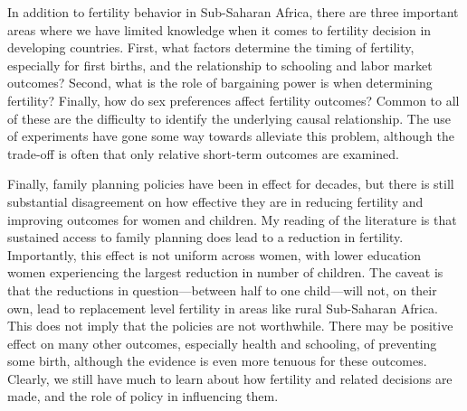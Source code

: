 In addition to fertility behavior in Sub-Saharan Africa, there are three important areas where we have limited knowledge when it comes to fertility decision in developing countries. First, what factors determine the timing of fertility, especially for first births, and the relationship to schooling and labor market outcomes? Second, what is the role of bargaining power is when determining fertility? Finally, how do sex preferences affect fertility outcomes? Common to all of these are the difficulty to identify the underlying causal relationship. The use of experiments have gone some way towards alleviate this problem, although the trade-off is often that only relative short-term outcomes are examined.

Finally, family planning policies have been in effect for decades, but there is still substantial disagreement on how effective they are in reducing fertility and improving outcomes for women and children. My reading of the literature is that sustained access to family planning does lead to a reduction in fertility. Importantly, this effect is not uniform across women, with lower education women experiencing the largest reduction in number of children. The caveat is that the reductions in question---between half to one child---will not, on their own, lead to replacement level fertility in areas like rural Sub-Saharan Africa. This does not imply that the policies are not worthwhile. There may be positive effect on many other outcomes, especially health and schooling, of preventing some birth, although the evidence is even more tenuous for these outcomes. Clearly, we still have much to learn about how fertility and related decisions are made, and the role of policy in influencing them.

